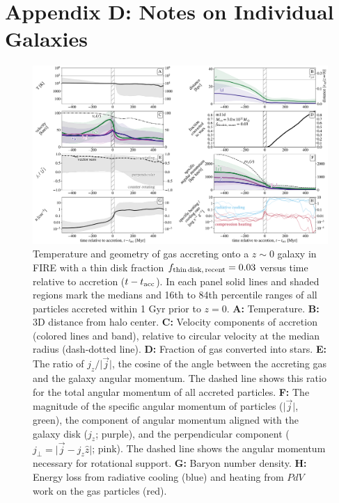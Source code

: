 \documentclass[class=article, crop=false]{standalone}
\newcommand{\fthin}{f_{\rm thin\,disk,\,recent}}
\newcommand{\tacc}{t_{\rm acc}}
\begin{document}
\section*{Appendix D: Notes on Individual Galaxies}

\begin{figure}\includegraphics[width=\textwidth]{figures/variations/relative_to_accretion/before_and_after/before_and_after_allone_m11d_md.pdf}
\caption{
Temperature and geometry of gas accreting onto a $z\sim0$ galaxy in FIRE with a thin disk fraction $\fthin=0.03$ versus time relative to accretion ($t - \tacc$).
In each panel solid lines and shaded regions mark the medians and 16th to 84th percentile ranges of all particles accreted within 1 Gyr prior to $z=0$.
\textbf{A:} Temperature.
\textbf{B:} 3D distance from halo center.
\textbf{C:} Velocity components of accretion (colored lines and band), relative to circular velocity at the median radius (dash-dotted line).
\textbf{D:} Fraction of gas converted into stars.
\textbf{E:} The ratio of $j_z / \vert \vec j \vert$, the cosine of the angle between the accreting gas and the galaxy angular momentum.
The dashed line shows this ratio for the total angular momentum of all accreted particles.
\textbf{F:} The magnitude of the specific angular momentum of particles ($\vert\vec{j}\vert$, green), the component of angular momentum aligned with the galaxy disk ($j_z$; purple), and the perpendicular component ($j_{\perp} = \vert \vec{j} - j_z \hat{z} \vert$; pink).
The dashed line shows the angular momentum necessary for rotational support.
\textbf{G:} Baryon number density.
\textbf{H:} Energy loss from radiative cooling (blue) and heating from $PdV$ work on the gas particles (red).
}
\label{f: m11d}
\end{figure}
\end{document}
